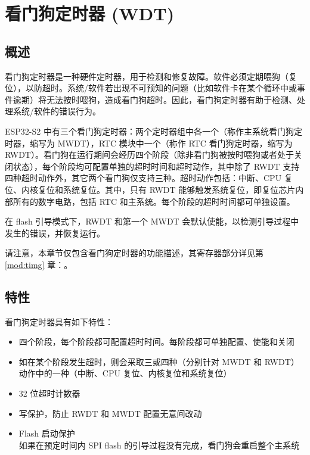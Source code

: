 \documentclass[main\_\_CN.tex]{subfiles}
\begin{document}
\setchineseformatting

\ifglobal
\else
    \listoftodos
    {\let\clearpage\relax \listofdonetodos}
    \tableofcontents
\fi




\hypertarget{wdt}{}
\chapter{看门狗定时器 (WDT)}
\label{mod:wdt}


\section{概述}

看门狗定时器是一种硬件定时器，用于检测和修复故障。软件必须定期喂狗（复位），以防超时。系统/软件若出现不可预知的问题（比如软件卡在某个循环中或事件逾期）将无法按时喂狗，造成看门狗超时。因此，看门狗定时器有助于检测、处理系统/软件的错误行为。

ESP32-S2 中有三个看门狗定时器：两个定时器组中各一个（称作主系统看门狗定时器，缩写为 MWDT），RTC 模块中一个（称作 RTC 看门狗定时器，缩写为 RWDT）。看门狗在运行期间会经历四个阶段（除非看门狗被按时喂狗或者处于关闭状态），每个阶段均可配置单独的超时时间和超时动作，其中除了 RWDT 支持四种超时动作外，其它两个看门狗仅支持三种。超时动作包括：中断、CPU 复位、内核复位和系统复位。其中，只有 RWDT 能够触发系统复位，即复位芯片内部所有的数字电路，包括 RTC 和主系统。每个阶段的超时时间都可单独设置。

在 flash 引导模式下，RWDT 和第一个 MWDT 会默认使能，以检测引导过程中发生的错误，并恢复运行。

请注意，本章节仅包含看门狗定时器的功能描述，其寄存器部分详见第 \ref{mod:timg} 章：\textit{}。

\section{特性}
看门狗定时器具有如下特性：
\begin{itemize}
    \item 四个阶段，每个阶段都可配置超时时间。每阶段都可单独配置、使能和关闭
    \item 如在某个阶段发生超时，则会采取三或四种（分别针对 MWDT 和 RWDT）动作中的一种（中断、CPU 复位、内核复位和系统复位）
    \item 32 位超时计数器
    \item 写保护，防止 RWDT 和 MWDT 配置无意间改动
    \item Flash 启动保护\\
    如果在预定时间内 SPI flash 的引导过程没有完成，看门狗会重启整个主系统
\end{itemize}
\end{document}
